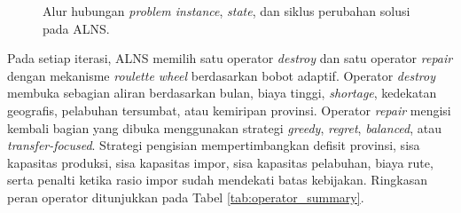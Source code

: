 \documentclass[journal]{IEEEtran}
\theoremstyle{definition}
\theoremstyle{definition}
\theoremstyle{plain}
\begin{document}
\begin{figure}[t]
{%
    }
    \caption{Alur hubungan \textit{problem instance}, \textit{state}, dan siklus perubahan solusi pada ALNS.}
    \label{fig:problem_state_alns_flow}
    \end{figure}

    Pada setiap iterasi, ALNS memilih satu operator \textit{destroy} dan satu operator \textit{repair} dengan mekanisme \textit{roulette wheel} berdasarkan bobot adaptif. Operator \textit{destroy} membuka sebagian aliran berdasarkan bulan, biaya tinggi, \textit{shortage}, kedekatan geografis, pelabuhan tersumbat, atau kemiripan provinsi. Operator \textit{repair} mengisi kembali bagian yang dibuka menggunakan strategi \textit{greedy}, \textit{regret}, \textit{balanced}, atau \textit{transfer-focused}. Strategi pengisian mempertimbangkan defisit provinsi, sisa kapasitas produksi, sisa kapasitas impor, sisa kapasitas pelabuhan, biaya rute, serta penalti ketika rasio impor sudah mendekati batas kebijakan. Ringkasan peran operator ditunjukkan pada Tabel \ref{tab:operator_summary}.
\end{document}
